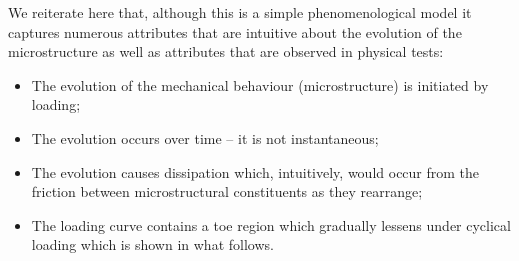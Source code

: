 \documentclass{article}
\begin{document}
We reiterate here that, although this is a simple phenomenological model it captures numerous attributes that are intuitive about the evolution of the microstructure as well as attributes that are observed in physical tests:
\begin{itemize}
	\item The evolution of the mechanical behaviour (microstructure) is initiated by loading;
	\item The evolution occurs over time -- it is not instantaneous;
	\item The evolution causes dissipation which, intuitively, would occur from the friction between microstructural constituents as they rearrange;
	\item The loading curve contains a toe region which gradually lessens under cyclical loading which is shown in what follows.
\end{itemize}
\end{document}
